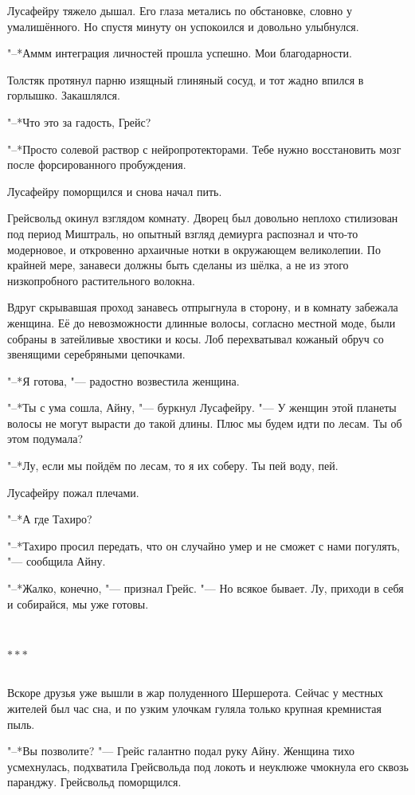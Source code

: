 \documentclass[a4paper,10pt]{book}
\newcommand{\ldotst}{\so{...}\xspace}
\newcommand{\razd}{~\\{\centering\Large\bfseries$\ast \ast \ast$\par}~\\}
\begin{document}
Лусафейру тяжело дышал. Его глаза метались по обстановке, словно у 
умалишённого. Но спустя минуту он успокоился и довольно улыбнулся.

"--*Аммм\ldotst интеграция личностей прошла успешно. Мои благодарности.

Толстяк протянул парню изящный глиняный сосуд, и тот жадно впился в горлышко. 
Закашлялся.

"--*Что это за гадость, Грейс?

"--*Просто солевой раствор с нейропротекторами. Тебе нужно восстановить мозг 
после форсированного пробуждения.

Лусафейру поморщился и снова начал пить.

Грейсвольд окинул взглядом комнату. Дворец был довольно неплохо стилизован под 
период Миштраль, но опытный взгляд демиурга распознал и что-то модерновое, и 
откровенно архаичные нотки в окружающем великолепии. По крайней мере, занавеси 
должны быть сделаны из шёлка, а не из этого низкопробного растительного волокна.

Вдруг скрывавшая проход занавесь отпрыгнула в сторону, и в комнату забежала 
женщина. Её до невозможности длинные волосы, согласно местной моде, были 
собраны в затейливые хвостики и косы. Лоб перехватывал кожаный обруч со 
звенящими серебряными цепочками.

"--*Я готова, "--- радостно возвестила женщина.

"--*Ты с ума сошла, Айну, "--- буркнул Лусафейру. "--- У женщин этой планеты 
волосы не могут вырасти до такой длины. Плюс мы будем идти по лесам. Ты об этом 
подумала?

"--*Лу, если мы пойдём по лесам, то я их соберу. Ты пей воду, пей.

Лусафейру пожал плечами.

"--*А где Тахиро?

"--*Тахиро просил передать, что он случайно умер и не сможет с нами погулять, 
"--- сообщила Айну.

"--*Жалко, конечно, "--- признал Грейс. "--- Но всякое бывает. Лу, приходи в 
себя и собирайся, мы уже готовы.

\razd

Вскоре друзья уже вышли в жар полуденного Шершерота. Сейчас у местных жителей 
был час сна, и по узким улочкам гуляла только крупная кремнистая пыль.

"--*Вы позволите? "--- Грейс галантно подал руку Айну. Женщина тихо 
усмехнулась, подхватила Грейсвольда под локоть и неуклюже чмокнула его сквозь 
паранджу. Грейсвольд поморщился.
\end{document}
